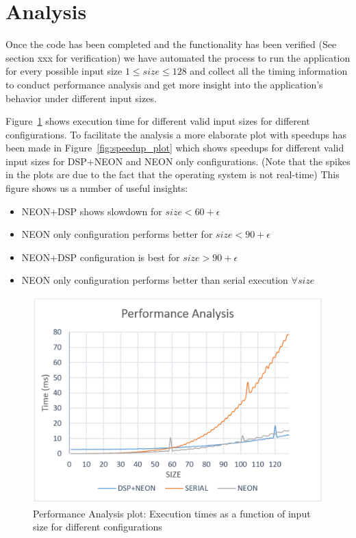 \newpage
\section{Analysis}

Once the code has been completed and the functionality has been verified (See section xxx for verification) we have automated the process to run the application for every possible input size $1 \leq size \leq 128$ and collect all the timing information to conduct performance analysis and get more insight into the application's behavior under different input sizes.

Figure~\ref{fig:perf_plot} shows execution time for different valid input sizes for different configurations. To facilitate the analysis a more elaborate plot with speedups has been made in Figure~\ref{fig:speedup_plot} which shows speedups for different valid input sizes for DSP+NEON and NEON only configurations. (Note that the spikes in the plots are due to the fact that the operating system is not real-time) This figure shows us a number of useful insights:

\begin{itemize}
\item{NEON+DSP shows slowdown for $size < 60 + \epsilon$}
\item{NEON only configuration performs better for $size < 90 + \epsilon$}
\item{NEON+DSP configuration is best for $size >90 + \epsilon$}
\item{NEON only configuration performs better than serial execution $ \forall size$}

\end{itemize}

\begin{figure}[h!]
\includegraphics[width=\textwidth]{analysis/perf_plot}
\caption{Performance Analysis plot: Execution times as a function of input size for different configurations}
\label{fig:perf_plot}
\end{figure}


